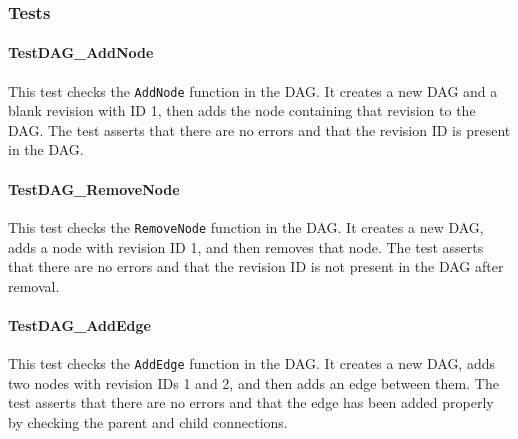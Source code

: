 \subsubsection*{Tests}

\paragraph{TestDAG\_AddNode}
This test checks the \lstinline{AddNode} function in the DAG. It creates a new DAG and a blank revision with ID 1, then adds the node containing that revision to the DAG. The test asserts that there are no errors and that the revision ID is present in the DAG.

\paragraph{TestDAG\_RemoveNode}
This test checks the \lstinline{RemoveNode} function in the DAG. It creates a new DAG, adds a node with revision ID 1, and then removes that node. The test asserts that there are no errors and that the revision ID is not present in the DAG after removal.

\paragraph{TestDAG\_AddEdge}
This test checks the \lstinline{AddEdge} function in the DAG. It creates a new DAG, adds two nodes with revision IDs 1 and 2, and then adds an edge between them. The test asserts that there are no errors and that the edge has been added properly by checking the parent and child connections.


